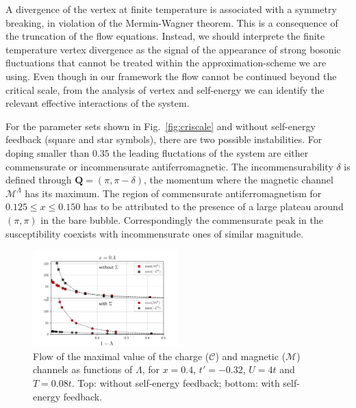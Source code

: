 A divergence of the vertex at finite temperature is associated with a symmetry breaking, in violation of the Mermin-Wagner theorem.\cite{Mermin1966}
This is a consequence of the truncation of the flow equations.
Instead, we should interprete the finite temperature vertex divergence as the signal of the appearance of strong bosonic fluctuations that cannot be treated within the approximation-scheme we are using.\cite{Salmhofer2001} 
Even though in our framework the flow cannot be continued beyond the critical scale, from the analysis of vertex and self-energy we can identify the relevant effective interactions of the system.

For the parameter sets shown in Fig.~\ref{fig:criscale} and without self-energy feedback (square and star symbols), there are two possible instabilities. 
For doping smaller than $0.35$ the leading fluctations of the system are either commensurate or incommensurate antiferromagnetic.
The incommensurability $\delta$ is defined through $\mathbf{Q}=(\pi,\pi-\delta)$, the momentum where the magnetic channel $\mathcal{M}^\Lambda$ has its maximum. 
The region of commensurate antiferromagnetism for  $0.125\le x \le 0.150$ has to be attributed to the presence of a large plateau around $(\pi,\pi)$ in the bare bubble. Correspondingly the commensurate peak in the susceptibility coexists with incommensurate ones of similar magnitude.   
\begin{figure}
\includegraphics[width=0.50\textwidth]{images/chargeproblem_MC_vs_Lambda_fix_occ.png}
\caption{Flow of the maximal value of the charge ($\mathcal{C}$) and magnetic ($\mathcal{M}$) channels as functions of $\Lambda$, for  $x=0.4$, $t'=-0.32$, $U=4t$ and $T=0.08t$.  Top: without self-energy feedback; bottom: with self-energy feedback. }
\label{fig:chargeproblem}
\end{figure}

